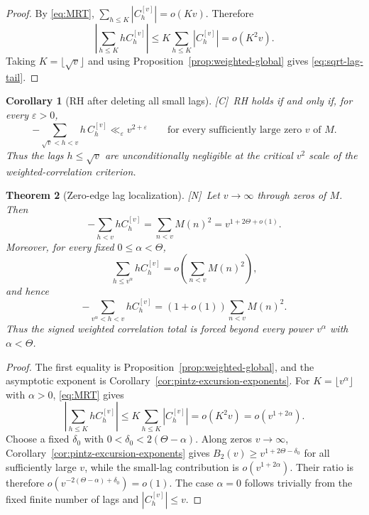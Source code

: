 \documentclass[11pt,reqno]{amsart}
\numberwithin{equation}{section}
\theoremstyle{plain}
\newtheorem{theorem}{Theorem}[section]
\newtheorem{corollary}[theorem]{Corollary}
\theoremstyle{definition}
\theoremstyle{remark}
\newcommand{\eps}{\varepsilon}
\newcommand{\tagN}{\textup{[N]}}
\newcommand{\tagC}{\textup{[C]}}
\begin{document}
\begin{proof}
By \eqref{eq:MRT},
$\sum_{h\le K}|C_h^{[v]}|=o(Kv)$. Therefore
\begin{equation}
\left|\sum_{h\le K}hC_h^{[v]}\right|
\le K\sum_{h\le K}|C_h^{[v]}|=o(K^2v).
\end{equation}
Taking $K=\lfloor\sqrt v\rfloor$ and using
Proposition~\ref{prop:weighted-global} gives \eqref{eq:sqrt-lag-tail}.
\end{proof}

\begin{corollary}[RH after deleting all small lags]
\label{cor:RH-large-lags}
\tagC\ RH holds if and only if, for every $\eps>0$,
\begin{equation}
-\sum_{\sqrt v<h<v}h\,C_h^{[v]}\ll_\eps v^{2+\eps}
\qquad\text{for every sufficiently large zero $v$ of $M$.}
\end{equation}
Thus the lags $h\le\sqrt v$ are unconditionally negligible at the critical
$v^2$ scale of the weighted-correlation criterion.
\end{corollary}

\begin{theorem}[Zero-edge lag localization]
\label{thm:theta-lag-localization}
\tagN\ Let $v\to\infty$ through zeros of $M$.  Then
\begin{equation}
\label{eq:weighted-corr-exponent}
 -\sum_{h<v}hC_h^{[v]}
 =\sum_{n<v}M(n)^2
 =v^{1+2\Theta+o(1)}.
\end{equation}
Moreover, for every fixed $0\le\alpha<\Theta$,
\begin{equation}
\label{eq:theta-small-lags-negligible}
 \sum_{h\le v^\alpha}hC_h^{[v]}
 =o\!\left(\sum_{n<v}M(n)^2\right),
\end{equation}
and hence
\begin{equation}
\label{eq:theta-large-lag-mass}
 -\sum_{v^\alpha<h<v}hC_h^{[v]}
 =(1+o(1))\sum_{n<v}M(n)^2.
\end{equation}
Thus the signed weighted correlation total is forced beyond every power
$v^\alpha$ with $\alpha<\Theta$.
\end{theorem}

\begin{proof}
The first equality is Proposition~\ref{prop:weighted-global}, and the
asymptotic exponent is Corollary~\ref{cor:pintz-excursion-exponents}.
For $K=\lfloor v^\alpha\rfloor$ with $\alpha>0$, \eqref{eq:MRT} gives
\begin{equation}
 \left|\sum_{h\le K}hC_h^{[v]}\right|
 \le K\sum_{h\le K}|C_h^{[v]}|
 =o(K^2v)=o(v^{1+2\alpha}).
\end{equation}
Choose a fixed $\delta_0$ with
$0<\delta_0<2(\Theta-\alpha)$.  Along zeros $v\to\infty$,
Corollary~\ref{cor:pintz-excursion-exponents} gives
$B_2(v)\ge v^{1+2\Theta-\delta_0}$ for all sufficiently large $v$, while
the small-lag contribution is $o(v^{1+2\alpha})$.  Their ratio is therefore
$o(v^{-2(\Theta-\alpha)+\delta_0})=o(1)$.  The case
$\alpha=0$ follows trivially from the fixed finite number of lags and
$|C_h^{[v]}|\le v$.
\end{proof}
\end{document}
